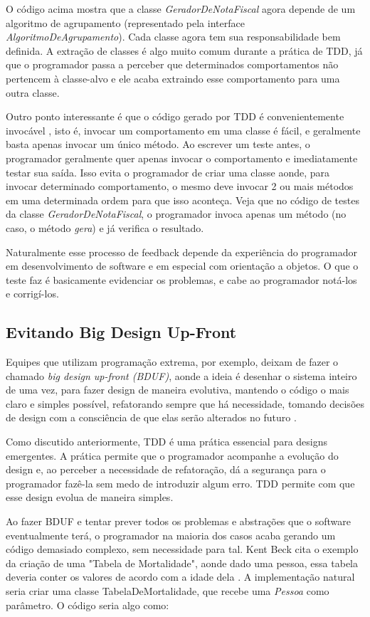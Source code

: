 O código acima mostra que a classe \textit{GeradorDeNotaFiscal} agora depende de um algoritmo de agrupamento (representado pela interface
\textit{AlgoritmoDeAgrupamento}). Cada classe agora tem sua responsabilidade bem definida. A extração de classes é algo muito comum
durante a prática de TDD, já que o programador passa a perceber que determinados comportamentos não pertencem à classe-alvo e ele
acaba extraindo esse comportamento para uma outra classe. 

Outro ponto interessante é que o código gerado por TDD é convenientemente invocável \cite{bob-martin}, isto é, invocar um comportamento em uma classe
é fácil, e geralmente basta apenas invocar um único método. Ao escrever um teste antes, o programador geralmente quer apenas invocar
o comportamento e imediatamente testar sua saída. Isso evita o programador de criar uma classe aonde, para invocar determinado comportamento,
o mesmo deve invocar 2 ou mais métodos em uma determinada ordem para que isso aconteça. 
Veja que no código de testes da classe \textit{GeradorDeNotaFiscal}, o programador
invoca apenas um método (no caso, o método \textit{gera}) e já verifica o resultado. 

Naturalmente esse processo de feedback depende da experiência do programador em desenvolvimento de software e em especial 
com orientação a objetos. O que o teste faz é basicamente evidenciar os problemas, e cabe ao programador notá-los e
corrigí-los.
 
\subsection{Evitando Big Design Up-Front}

Equipes que utilizam programação extrema, por exemplo, 
deixam de fazer o chamado \textit{big design up-front (BDUF)}, aonde a ideia é desenhar o sistema inteiro de uma vez, para fazer design de maneira evolutiva,
mantendo o código o mais claro e simples possível, refatorando sempre que há necessidade, tomando decisões de design com a consciência de que elas
serão alterados no futuro \cite{is-design-dead}.

Como discutido anteriormente, TDD é uma prática essencial para designs emergentes. A prática permite que o programador acompanhe a 
evolução do design e, ao perceber a necessidade de refatoração, dá a segurança para o programador fazê-la sem medo de introduzir algum erro. 
TDD permite com que esse design evolua de maneira simples. 

Ao fazer BDUF e tentar prever todos os problemas e abstrações que o software eventualmente terá, o programador na maioria dos casos
acaba gerando um código demasiado complexo, sem necessidade para tal. Kent Beck cita o exemplo da criação de uma "Tabela de Mortalidade",
aonde dado uma pessoa, essa tabela deveria conter os valores de acordo com a idade dela \cite{aim-fire}. A implementação natural
seria criar uma classe TabelaDeMortalidade, que recebe uma \textit{Pessoa} como parâmetro. O código seria algo como:

